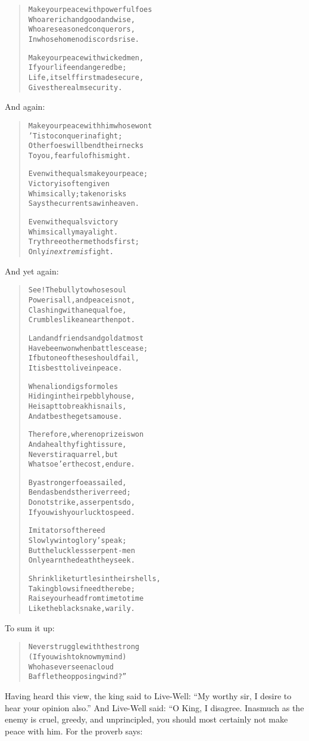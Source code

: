 \documentclass[article, twoside, 14pt]{memoir}
\renewenvironment{verbatim}{%
\begin{quote}%
\vskip -10pt%
\begin{alltt}\normalfont\large}{\end{alltt}%
\end{quote}%
\vskip -10pt
} %
\begin{document}
\begin{verbatim}
Make your peace with powerful foes
    Who are rich and good and wise,
Who are seasoned conquerors,
In whose home no discords rise.

Make your peace with wicked men,
    If your life endangered be;
Life, itself first made secure,
    Gives the realm security.
\end{verbatim}
And again:

\begin{verbatim}
Make your peace with him whose wont
    'Tis to conquer in a fight;
Other foes will bend their necks
    To you, fearful of his might.

Even with equals make your peace;
    Victory is often given
Whimsically; take no risks{\textemdash}
    Says the current saw in heaven.

Even with equals victory
    Whimsically may alight.
Try three other methods first;
    Only \emph{in extremis} fight.
\end{verbatim}
And yet again:

\begin{verbatim}
See! The bully to whose soul
    Power is all, and peace is not,
Clashing with an equal foe,
    Crumbles like an earthen pot.

Land and friends and gold at most
    Have been won when battles cease;
If but one of these should fail,
    It is best to live in peace.

When a lion digs for moles
    Hiding in their pebbly house,
He is apt to break his nails,
    And at best he gets a mouse.

Therefore, where no prize is won
    And a healthy fight is sure,
Never stir a quarrel, but
    Whatsoe'er the cost, endure.

By a stronger foe assailed,
    Bend as bends the river reed;
Do not strike, as serpents do,
    If you wish your luck to speed.

Imitators of the reed
    Slowly win to glory's peak;
But the luckless serpent-men
    Only earn the death they seek.

Shrink like turtles in their shells,
    Taking blows if need there be;
Raise your head from time to time
    Like the black snake, warily.
\end{verbatim}
To sum it up:

\begin{verbatim}
Never struggle with the strong
    (If you wish to know my mind)
Who has ever seen a cloud
    Baffle the opposing wind?”
\end{verbatim}
Having heard this view, the king said to Live-Well:
``My worthy sir, I desire to hear your opinion also.'' And
Live-Well said: “O King, I disagree. Inasmuch as the enemy is
cruel, greedy, and unprincipled, you should most certainly not make
peace with him. For the proverb says:
\end{document}
